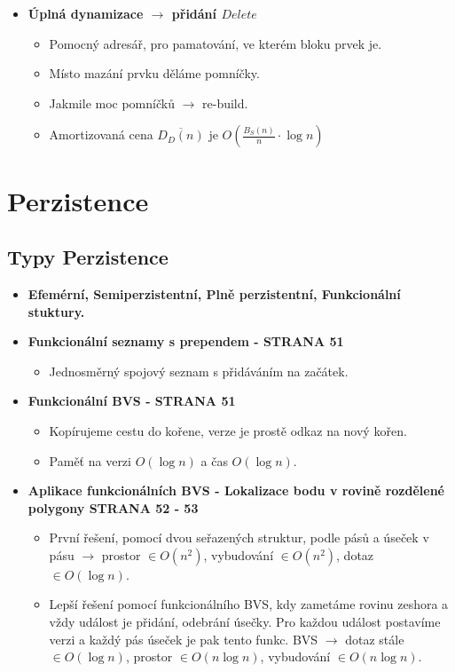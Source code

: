 \documentclass[11pt,a4paper]{article}
\begin{document}
\begin{itemize}
\begin{itemize}
        \item Dotaz stále v $Q_D(n) \in O(Q_S(n) \cdot \log n)$
        \item Vkládání má novou w.c. složitost $I_D(n) \in O(\frac{B_S(n)}{n} \cdot \log n)$.
    \end{itemize}
    \item \textbf{Úplná dynamizace $\rightarrow$ přidání $Delete$}
    \begin{itemize}
        \item Pomocný adresář, pro pamatování, ve kterém bloku prvek je.
        \item Místo mazání prvku děláme pomníčky.
        \item Jakmile moc pomníčků $\rightarrow$ re-build.
        \item Amortizovaná cena $\overline{D_D(n)}$ je $O(\frac{B_S(n)}{n} \cdot \log n)$
    \end{itemize}
\end{itemize}

\section{Perzistence}
\subsection{Typy Perzistence}
\begin{itemize}
    \item \textbf{Efemérní, Semiperzistentní, Plně perzistentní, Funkcionální stuktury.}
    \item \textbf{Funkcionální seznamy s prependem - STRANA 51}
    \begin{itemize}
        \item Jednosměrný spojový seznam s přidáváním na začátek.
    \end{itemize}
    \item \textbf{Funkcionální BVS - STRANA 51}
    \begin{itemize}
        \item Kopírujeme cestu do kořene, verze je prostě odkaz na nový kořen.
        \item Paměť na verzi $O(\log n)$ a čas $O(\log n)$.
    \end{itemize}
    \item \textbf{Aplikace funkcionálních BVS - Lokalizace bodu v rovině rozdělené polygony STRANA 52 - 53}
    \begin{itemize}
        \item První řešení, pomocí dvou seřazených struktur, podle pásů a úseček v pásu $\rightarrow$ prostor $\in O(n^2)$, vybudování $\in O(n^2)$, dotaz $\in O(\log n)$.
        \item Lepší řešení pomocí funkcionálního BVS, kdy zametáme rovinu zeshora a vždy událost je přidání, odebrání úsečky. Pro každou událost postavíme verzi a každý pás úseček je pak tento funkc. BVS $\rightarrow$ dotaz stále $\in O(\log n)$, prostor $\in O(n \log n)$, vybudování $\in O(n \log n)$.
    \end{itemize}
\end{itemize}
\end{document}
